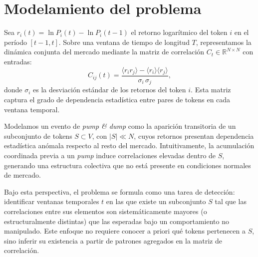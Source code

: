 \section{Modelamiento del problema}

Sea $r_i(t) = \ln P_i(t) - \ln P_i(t-1)$ el retorno logarítmico del token $i$ en el período $[t-1, t]$. Sobre una ventana de tiempo de longitud $T$, representamos la dinámica conjunta del mercado mediante la matriz de correlación $C_t \in \mathbb{R}^{N \times N}$ con entradas:
\begin{equation}
  C_{ij}(t) = \frac{\langle r_i r_j \rangle - \langle r_i \rangle\langle r_j \rangle}
  {\sigma_i \,\sigma_j},
  \label{eq:pearson}
\end{equation}
donde $\sigma_i$ es la desviación estándar de los retornos del token $i$. Esta matriz captura el grado de dependencia estadística entre pares de tokens en cada ventana temporal.

Modelamos un evento de \emph{pump \& dump} como la aparición transitoria de un subconjunto de tokens $S \subset V$, con $|S| \ll N$, cuyos retornos presentan dependencia estadística anómala respecto al resto del mercado. Intuitivamente, la acumulación coordinada previa a un \emph{pump} induce correlaciones elevadas dentro de $S$, generando una estructura colectiva que no está presente en condiciones normales de mercado.

Bajo esta perspectiva, el problema se formula como una tarea de detección: identificar ventanas temporales $t$ en las que existe un subconjunto $S$ tal que las correlaciones entre sus elementos son sistemáticamente mayores (o estructuralmente distintas) que las esperadas bajo un comportamiento no manipulado. Este enfoque no requiere conocer a priori qué tokens pertenecen a $S$, sino inferir su existencia a partir de patrones agregados en la matriz de correlación.